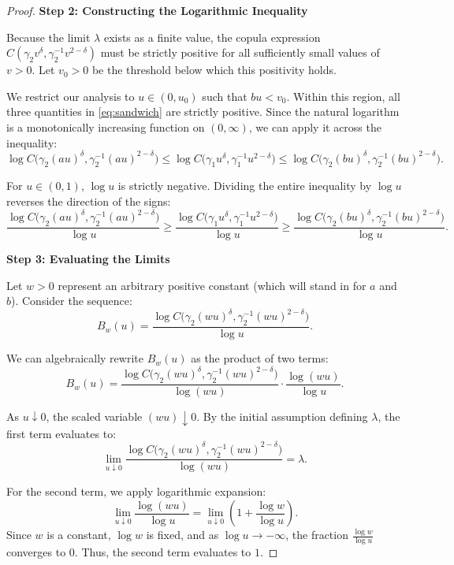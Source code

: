 \documentclass{article}
\begin{document}
\begin{proof}
\vspace{1em}
\noindent \textbf{Step 2: Constructing the Logarithmic Inequality}

Because the limit $\lambda$ exists as a finite value, the copula expression $C(\gamma_2 v^\delta, \gamma_2^{-1}v^{2-\delta})$ must be strictly positive for all sufficiently small values of $v > 0$. Let $v_0 > 0$ be the threshold below which this positivity holds. 

We restrict our analysis to $u \in (0, u_0)$ such that $b u < v_0$. Within this region, all three quantities in \eqref{eq:sandwich} are strictly positive. Since the natural logarithm is a monotonically increasing function on $(0, \infty)$, we can apply it across the inequality:
\[
\log C\!\bigl(\gamma_2(a u)^\delta, \gamma_2^{-1}(a u)^{2-\delta}\bigr) \le \log C\!\bigl(\gamma_1 u^\delta, \gamma_1^{-1}u^{2-\delta}\bigr) \le \log C\!\bigl(\gamma_2(b u)^\delta, \gamma_2^{-1}(b u)^{2-\delta}\bigr).
\]

For $u \in (0, 1)$, $\log u$ is strictly negative. Dividing the entire inequality by $\log u$ reverses the direction of the signs:
\begin{equation} \label{eq:log_sandwich}
\frac{\log C\!\bigl(\gamma_2(a u)^\delta, \gamma_2^{-1}(a u)^{2-\delta}\bigr)}{\log u} \ge \frac{\log C\!\bigl(\gamma_1 u^\delta, \gamma_1^{-1}u^{2-\delta}\bigr)}{\log u} \ge \frac{\log C\!\bigl(\gamma_2(b u)^\delta, \gamma_2^{-1}(b u)^{2-\delta}\bigr)}{\log u}.
\end{equation}

\vspace{1em}
\noindent \textbf{Step 3: Evaluating the Limits}

Let $w > 0$ represent an arbitrary positive constant (which will stand in for $a$ and $b$). Consider the sequence:
\[
B_w(u) = \frac{\log C\!\bigl(\gamma_2(w u)^\delta, \gamma_2^{-1}(w u)^{2-\delta}\bigr)}{\log u}.
\]

We can algebraically rewrite $B_w(u)$ as the product of two terms:
\[
B_w(u) = \frac{\log C\!\bigl(\gamma_2(w u)^\delta, \gamma_2^{-1}(w u)^{2-\delta}\bigr)}{\log (wu)} \cdot \frac{\log (wu)}{\log u}.
\]

As $u \downarrow 0$, the scaled variable $(wu) \downarrow 0$. By the initial assumption defining $\lambda$, the first term evaluates to:
\[
\lim_{u\downarrow 0} \frac{\log C\!\bigl(\gamma_2(w u)^\delta, \gamma_2^{-1}(w u)^{2-\delta}\bigr)}{\log (wu)} = \lambda.
\]

For the second term, we apply logarithmic expansion:
\[
\lim_{u\downarrow 0} \frac{\log (wu)}{\log u} = \lim_{u\downarrow 0} \left( 1 + \frac{\log w}{\log u} \right).
\]
Since $w$ is a constant, $\log w$ is fixed, and as $\log u \to -\infty$, the fraction $\frac{\log w}{\log u}$ converges to $0$. Thus, the second term evaluates to $1$. 


\end{proof}
\end{document}
